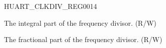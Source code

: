 \begin{register}{H}{UART\_CLKDIV\_REG}{\hexprefix{}0014}\label{regdesc:UARTCLKDIVREG}
%
%
%
\regnewline%
\begin{regdesc}\begin{reglist}
\label{fielddesc:UARTCLKDIV}\item [UART\_CLKDIV] The integral part of the frequency divisor. (R/W)
\label{fielddesc:UARTCLKDIVFRAG}\item [UART\_CLKDIV\_FRAG] The fractional part of the frequency divisor. (R/W)
\end{reglist}\end{regdesc}
\end{register}



